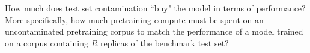 
How much does test set contamination ``buy" the model in terms of performance? 
More specifically, how much pretraining compute must be spent on an uncontaminated pretraining corpus to match the performance of a model trained on a corpus containing $R$ replicas of the benchmark test set?

